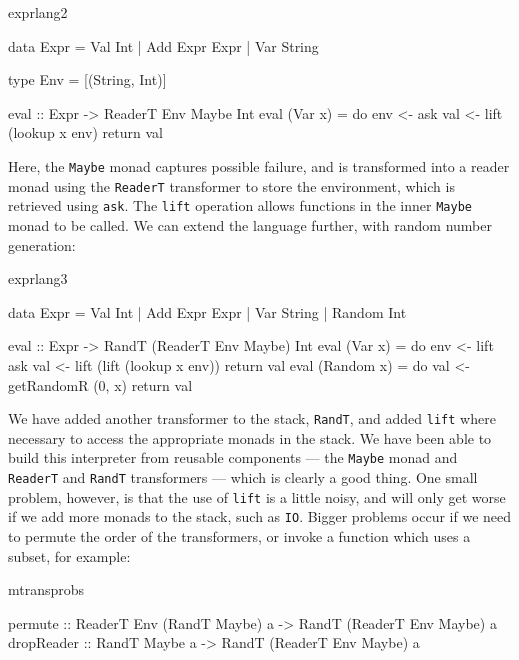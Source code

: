 \begin{SaveVerbatim}{exprlang2}

data Expr = Val Int | Add Expr Expr | Var String

type Env = [(String, Int)]

eval :: Expr -> ReaderT Env Maybe Int
eval (Var x) = do env <- ask
                  val <- lift (lookup x env)
                  return val

\end{SaveVerbatim}

\noindent
Here, the \texttt{Maybe} monad captures possible failure, and is transformed
into a reader monad using the \texttt{ReaderT} transformer to store the
environment, which is retrieved using \texttt{ask}. The \texttt{lift} operation
allows functions in the inner \texttt{Maybe} monad to be called.  
We can extend the language further, with random number generation:

\begin{SaveVerbatim}{exprlang3}

data Expr = Val Int | Add Expr Expr | Var String
          | Random Int

eval :: Expr -> RandT (ReaderT Env Maybe) Int
eval (Var x) = do env <- lift ask
                  val <- lift (lift (lookup x env))
                  return val
eval (Random x) = do val <- getRandomR (0, x)
                     return val

\end{SaveVerbatim}

\noindent
We have added another transformer to the stack, \texttt{RandT}, and added
\texttt{lift} where necessary to access the appropriate monads in the stack.
We have been able to build this interpreter from reusable components --- the
\texttt{Maybe} monad and \texttt{ReaderT} and \texttt{RandT} transformers ---
which is clearly a good thing. One small problem, however, is that the use of
\texttt{lift} is a little noisy, and will only get worse if we add more
monads to the stack, such as \texttt{IO}. Bigger problems occur if we need
to permute the order of the transformers, or invoke a function which uses a
subset, for example:

\begin{SaveVerbatim}{mtransprobs}

permute :: ReaderT Env (RandT Maybe) a -> 
           RandT (ReaderT Env Maybe) a
dropReader :: RandT Maybe a -> 
              RandT (ReaderT Env Maybe) a

\end{SaveVerbatim}

